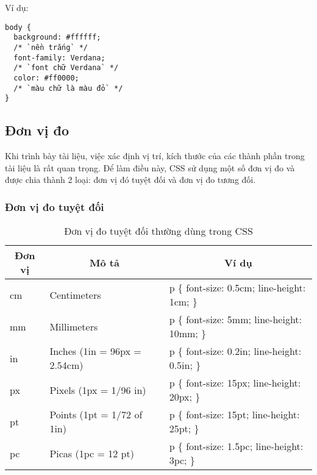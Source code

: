 Ví dụ:
\lstset{language=XML}
\begin{lstlisting}[escapechar=`]
body {
  background: #ffffff;
  /* `nền trắng` */
  font-family: Verdana;
  /* `font chữ Verdana` */
  color: #ff0000;
  /* `màu chữ là màu đỏ` */
}
\end{lstlisting}
\subsection {Đơn vị đo}
Khi trình bày tài liệu, việc xác định vị trí, kích thước của các thành phần trong tài liệu là rất quan trọng. Để làm điều này, CSS sử dụng một số đơn vị đo và được chia thành 2 loại: đơn vị đó tuyệt đối và đơn vị đo tương đối.

\subsubsection{ Đơn vị đo tuyệt đối}
\begin{center}

 \begin{longtable}{|m{2cm}|m{3cm}| m{6cm}|} 
 \caption[Đơn vị đo tuyệt đối thường dùng trong CSS] { Đơn vị đo tuyệt đối thường dùng trong CSS }
  \endfirsthead
  \endhead
 
\hline 

 \multicolumn{1}{|c|}{\textbf{ Đơn vị}}
   &
 \multicolumn{1}{c|}{\textbf{Mô tả}}
   &
 \multicolumn{1}{|c|}{ \textbf{Ví dụ}}

\\ \hline
cm &	Centimeters & 

{\ttfamily
	p \{	  font-size: 0.5cm;	  line-height: 1cm;	\}
}
 \\ \hline   
mm &	Millimeters &	p \{
  font-size: 5mm;
  line-height: 10mm;
\}  \\ \hline 
in &	Inches (1in = 96px = 2.54cm) &	p \{
  font-size: 0.2in;
  line-height: 0.5in;
\} \\ \hline
px &	Pixels (1px = 1/96 in) &	p \{
  font-size: 15px;
  line-height: 20px;
\} \\ \hline
pt &	Points (1pt = 1/72 of 1in) &	p \{
  font-size: 15pt;
  line-height: 25pt;
\} \\ \hline
pc &
Picas (1pc = 12 pt) &	p \{
  font-size: 1.5pc;
  line-height: 3pc;
\} \\ \hline

\end{longtable}


\end{center}
\vspace{-1cm}

